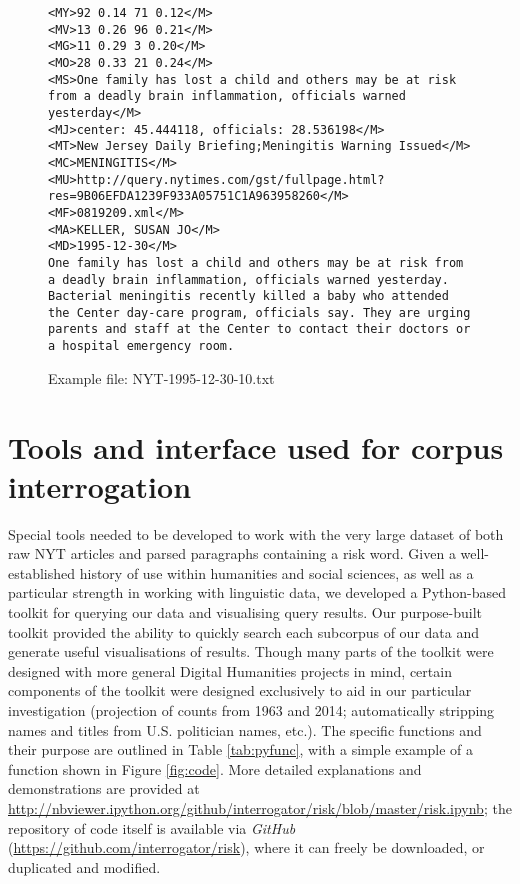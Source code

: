 \begin{figure}
\footnotesize
\begin{lstlisting}[breaklines]
<MY>92 0.14 71 0.12</M>
<MV>13 0.26 96 0.21</M>
<MG>11 0.29 3 0.20</M>
<MO>28 0.33 21 0.24</M>
<MS>One family has lost a child and others may be at risk from a deadly brain inflammation, officials warned yesterday</M>
<MJ>center: 45.444118, officials: 28.536198</M>
<MT>New Jersey Daily Briefing;Meningitis Warning Issued</M>
<MC>MENINGITIS</M>
<MU>http://query.nytimes.com/gst/fullpage.html?res=9B06EFDA1239F933A05751C1A963958260</M>
<MF>0819209.xml</M>
<MA>KELLER, SUSAN JO</M>
<MD>1995-12-30</M>
One family has lost a child and others may be at risk from a deadly brain inflammation, officials warned yesterday. Bacterial meningitis recently killed a baby who attended the Center day-care program, officials say. They are urging parents and staff at the Center to contact their doctors or a hospital emergency room.
\end{lstlisting}
\caption{Example file: NYT-1995-12-30-10.txt}
\label{fig:exfile}
\end{figure}

\section{Tools and interface used for corpus interrogation}

Special tools needed to be developed to work with the very large dataset of both raw NYT articles and parsed paragraphs containing a risk word. Given a well-established history of use within humanities and social sciences, as well as a particular strength in working with linguistic data, we developed a Python-based toolkit for querying our data and visualising query results. Our purpose-built toolkit provided the ability to quickly search each subcorpus of our data and generate useful visualisations of results. Though many parts of the toolkit were designed with more general Digital Humanities projects in mind, certain components of the toolkit were designed exclusively to aid in our particular investigation (projection of counts from 1963 and 2014; automatically stripping names and titles from U.S. politician names, etc.). The specific functions and their purpose are outlined in Table \ref{tab:pyfunc}, with a simple example of a function shown in Figure \ref{fig:code}. More detailed explanations and demonstrations are provided at \url{http://nbviewer.ipython.org/github/interrogator/risk/blob/master/risk.ipynb}; the repository of code itself is available via \emph{GitHub} (\url{https://github.com/interrogator/risk}), where it can freely be downloaded, or duplicated and modified.


